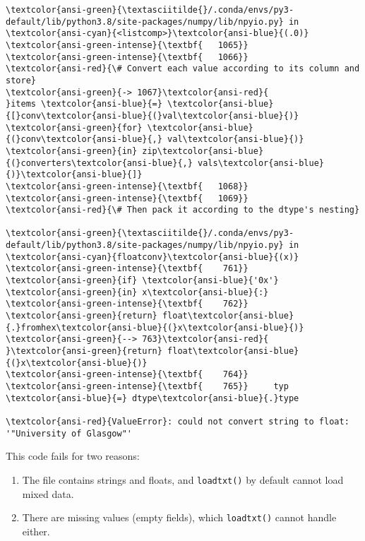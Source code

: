 \documentclass[10pt]{scrartcl}
\providecommand{\tightlist}{%
      \setlength{\itemsep}{0pt}\setlength{\parskip}{0pt}}
\begin{document}
\begin{Verbatim}[commandchars=\\\{\}, frame=single, framerule=2mm, rulecolor=\color{outerrorbackground}]
\textcolor{ansi-green}{\textasciitilde{}/.conda/envs/py3-default/lib/python3.8/site-packages/numpy/lib/npyio.py} in \textcolor{ansi-cyan}{<listcomp>}\textcolor{ansi-blue}{(.0)}
\textcolor{ansi-green-intense}{\textbf{   1065}} 
\textcolor{ansi-green-intense}{\textbf{   1066}}             \textcolor{ansi-red}{\# Convert each value according to its column and store}
\textcolor{ansi-green}{-> 1067}\textcolor{ansi-red}{             }items \textcolor{ansi-blue}{=} \textcolor{ansi-blue}{[}conv\textcolor{ansi-blue}{(}val\textcolor{ansi-blue}{)} \textcolor{ansi-green}{for} \textcolor{ansi-blue}{(}conv\textcolor{ansi-blue}{,} val\textcolor{ansi-blue}{)} \textcolor{ansi-green}{in} zip\textcolor{ansi-blue}{(}converters\textcolor{ansi-blue}{,} vals\textcolor{ansi-blue}{)}\textcolor{ansi-blue}{]}
\textcolor{ansi-green-intense}{\textbf{   1068}} 
\textcolor{ansi-green-intense}{\textbf{   1069}}             \textcolor{ansi-red}{\# Then pack it according to the dtype's nesting}

\textcolor{ansi-green}{\textasciitilde{}/.conda/envs/py3-default/lib/python3.8/site-packages/numpy/lib/npyio.py} in \textcolor{ansi-cyan}{floatconv}\textcolor{ansi-blue}{(x)}
\textcolor{ansi-green-intense}{\textbf{    761}}         \textcolor{ansi-green}{if} \textcolor{ansi-blue}{'0x'} \textcolor{ansi-green}{in} x\textcolor{ansi-blue}{:}
\textcolor{ansi-green-intense}{\textbf{    762}}             \textcolor{ansi-green}{return} float\textcolor{ansi-blue}{.}fromhex\textcolor{ansi-blue}{(}x\textcolor{ansi-blue}{)}
\textcolor{ansi-green}{--> 763}\textcolor{ansi-red}{         }\textcolor{ansi-green}{return} float\textcolor{ansi-blue}{(}x\textcolor{ansi-blue}{)}
\textcolor{ansi-green-intense}{\textbf{    764}} 
\textcolor{ansi-green-intense}{\textbf{    765}}     typ \textcolor{ansi-blue}{=} dtype\textcolor{ansi-blue}{.}type

\textcolor{ansi-red}{ValueError}: could not convert string to float: '"University of Glasgow"'
    \end{Verbatim}

    This code fails for two reasons:

\begin{enumerate}
\def\labelenumi{\arabic{enumi}.}
\tightlist
\item
  The file contains strings and floats, and \texttt{loadtxt()} by
  default cannot load mixed data.
\item
  There are missing values (empty fields), which \texttt{loadtxt()}
  cannot handle either.
\end{enumerate}
\end{document}
